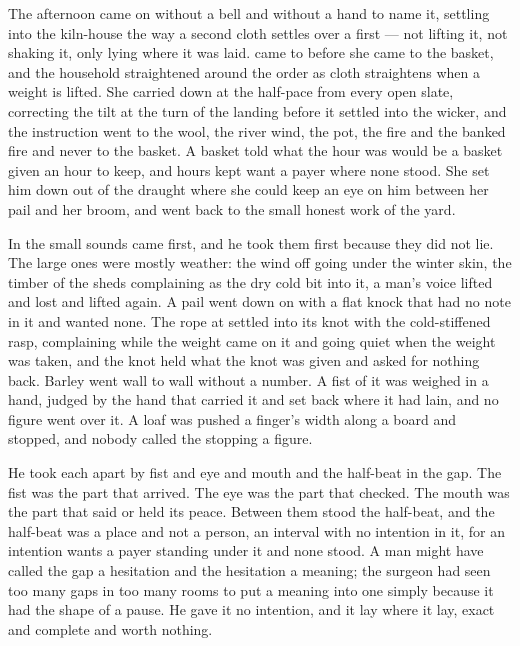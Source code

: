 The afternoon came on without a bell and without a hand to name it, settling into the kiln-house the way a second cloth settles over a first --- not lifting it, not shaking it, only lying where it was laid.  came to  before she came to the basket, and the household straightened around the order as cloth straightens when a weight is lifted. She carried  down  at the half-pace from every open slate, correcting the tilt at the turn of the landing before it settled into the wicker, and the instruction went to the wool, the river wind, the pot, the fire and the banked fire and never to the basket. A basket told what the hour was would be a basket given an hour to keep, and hours kept want a payer where none stood. She set him down out of the draught where she could keep an eye on him between her pail and her broom, and went back to the small honest work of the yard.

In  the small sounds came first, and he took them first because they did not lie. The large ones were mostly weather: the wind off  going under the winter skin, the timber of the sheds complaining as the dry cold bit into it, a man's voice lifted and lost and lifted again. A pail went down on  with a flat knock that had no note in it and wanted none. The rope at  settled into its knot with the cold-stiffened rasp, complaining while the weight came on it and going quiet when the weight was taken, and the knot held what the knot was given and asked for nothing back. Barley went wall to wall without a number. A fist of it was weighed in a hand, judged by the hand that carried it and set back where it had lain, and no figure went over it. A loaf was pushed a finger's width along a board and stopped, and nobody called the stopping a figure.

He took each apart by fist and eye and mouth and the half-beat in the gap. The fist was the part that arrived. The eye was the part that checked. The mouth was the part that said or held its peace. Between them stood the half-beat, and the half-beat was a place and not a person, an interval with no intention in it, for an intention wants a payer standing under it and none stood. A man might have called the gap a hesitation and the hesitation a meaning; the surgeon had seen too many gaps in too many rooms to put a meaning into one simply because it had the shape of a pause. He gave it no intention, and it lay where it lay, exact and complete and worth nothing.

